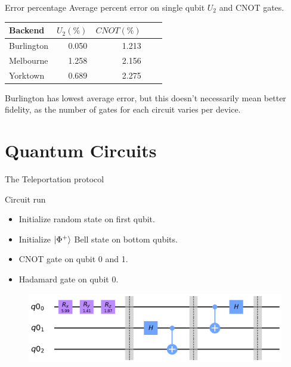\begin{frame}{Error percentage}
Average percent error on single qubit $U_2$ and CNOT gates.
\vspace{0.5cm}
\begin{table} \centering
	\begin{tabular}{lrrrr} \toprule Backend & $U_2 (\%)$ & $CNOT (\%)$ \\ \midrule
		Burlington & 0.050 & 1.213 \\ Melbourne & 1.258 & 2.156 \\ Yorktown & 0.689 &
		2.275 \\ \bottomrule
	\end{tabular}
	\label{tb:average_errors}
\end{table}
\vspace{0.5cm}
Burlington has lowest average error, but this doesn't necessarily mean better fidelity, as the number of gates for each circuit varies per device.
\end{frame}


\section{Quantum Circuits}

\begin{frame}{The Teleportation protocol}
	
	\begin{block}{Circuit run}
		\begin{itemize}
			\item Initialize random state on first qubit.
			\item Initialize $\ket{\Phi^+}$ Bell state on bottom qubits.
			\item CNOT gate on qubit 0 and 1.
			\item Hadamard gate on qubit 0.
		\end{itemize}
	\end{block}
	
	\begin{figure}[h] \centering
		\includegraphics[width=\textwidth]{images/teleport_circuit.png}
		\label{fig:tele_circ}
	\end{figure}

\end{frame}


